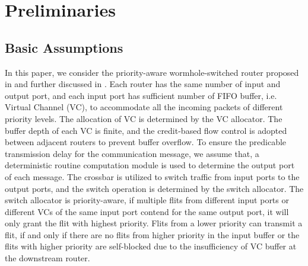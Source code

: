 \documentclass[10pt,journal]{IEEEtran}
\begin{document}
\section{Preliminaries}\label{model}
\subsection{Basic Assumptions}
In this paper, we consider the priority-aware wormhole-switched router proposed in \cite{Shi:2008:RCA:1397757.1397996} and further discussed in \cite{627905}\cite{707545}\cite{73}. Each router has the same number of input and output port, and each input port has sufficient number of FIFO buffer, i.e. Virtual Channel (VC), to accommodate all the incoming packets of different priority levels. The allocation of VC is determined by the VC allocator. The buffer depth of each VC is finite, and the credit-based flow control \cite{DaTo04} is adopted between adjacent routers to prevent buffer overflow. To ensure the predicable transmission delay for the communication message, we assume that, a deterministic routine computation module is used to determine the output port of each message. The crossbar is utilized to switch traffic from input ports to the output ports, and the switch operation is determined by the switch allocator. The switch allocator is priority-aware, if multiple flits from different input ports or different VCs of the same input port contend for the same output port, it will only grant the flit with highest priority. Flits from a lower priority can transmit a flit, if and only if there are no flits from higher priority in the input buffer or the flits with higher priority are self-blocked due to the insufficiency of VC buffer at the downstream router.
\end{document}
